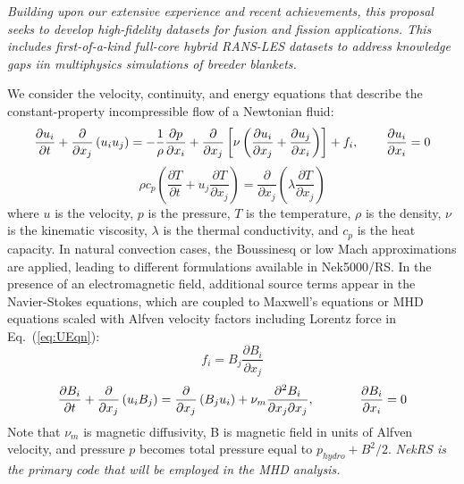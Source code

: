 \begin{displayquote}
\textit{
Building upon our extensive experience and recent achievements, this proposal seeks to develop high-fidelity datasets for fusion and fission applications. This includes first-of-a-kind full-core hybrid RANS-LES datasets to address knowledge gaps iin multiphysics simulations of breeder blankets.}
\end{displayquote}

We consider the velocity, continuity, and energy equations that
describe the constant-property incompressible flow of a Newtonian fluid:
\begin{equation}
\frac{\partial  u_i  }{\partial t} +  \frac{\partial}{\partial x_j} \left( u_i u_j \right) =-\frac{1}{\rho} \frac{\partial p}{\partial x_i} + \frac{\partial}{\partial x_j} \left[ \nu \left( \frac{\partial u_i}{\partial x_j} +\frac{\partial u_j}{\partial x_i} \right) \right]
+ f_i,
\hspace*{.3in}
\frac{\partial u_i}{\partial x_i} = 0
\label{eq:UEqn}
\end{equation}
\begin{equation}
\rho c_p \left( \frac{\partial T }{\partial t} + u_j \frac{\partial T}{\partial x_j} \right) = \frac{\partial }{\partial x_j} \left( \lambda \frac{\partial T}{\partial x_j} \right)
\label{eq:EEqn}
\end{equation}
where $u$ is the velocity, $p$ is the pressure, $T$ is the temperature, $\rho$
is the  density, $\nu$ is the kinematic viscosity, $\lambda$ is
the thermal conductivity, and $c_p$ is the heat capacity. In natural
convection cases, the Boussinesq or low Mach approximations
\cite{tomboulides1997numerical} are applied, leading to different
formulations available in Nek5000/RS. In the presence of an electromagnetic
field, additional source terms appear in the Navier-Stokes equations, which are
coupled to Maxwell's equations or MHD equations scaled with Alfven velocity
factors including Lorentz force in Eq.~(\ref{eq:UEqn}):
%
\begin{equation}
f_i = B_j \frac{\partial  B_i}{\partial x_j} 
\label{eq:MHDL}
\end{equation}
\begin{equation}
\frac{\partial  B_i  }{\partial t} +  \frac{\partial}{\partial x_j} \left( u_i B_j \right) = \frac{\partial }{\partial x_j} \left( B_j u_i \right) +  \nu_m \frac{\partial^2  B_i}{\partial x_j \partial x_j}, \hspace*{.5in}
\frac{\partial B_i}{\partial x_i} = 0
\label{eq:MHDB}
\end{equation}
Note that $\nu_m$ is magnetic diffusivity, B is magnetic field in units of Alfven velocity, and pressure $p$ becomes total pressure equal to $p_{hydro} + B^2/2$.
{\it NekRS is the primary code that will be employed
in the MHD analysis.}

